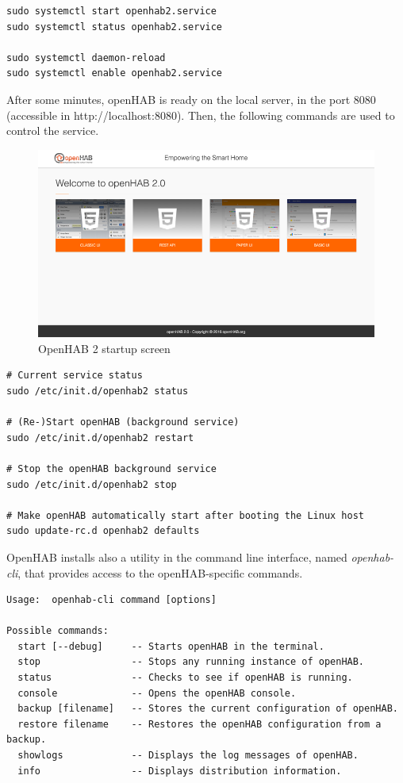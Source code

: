 \begin{lstlisting}[style=Consola]
sudo systemctl start openhab2.service
sudo systemctl status openhab2.service

sudo systemctl daemon-reload
sudo systemctl enable openhab2.service
\end{lstlisting}

After some minutes, openHAB is ready on the local server, in the port 8080 (accessible in http://localhost:8080). Then, the following
commands are used to control the service.

\begin{figure}
    \centering
    \includegraphics[width=1\textwidth]{images/Chapter_06/openhab-startup.png}
    \caption{OpenHAB 2 startup screen}
    \label{fig:openhab-startup}
\end{figure}

\begin{lstlisting}[style=Consola]
# Current service status
sudo /etc/init.d/openhab2 status

# (Re-)Start openHAB (background service)
sudo /etc/init.d/openhab2 restart

# Stop the openHAB background service
sudo /etc/init.d/openhab2 stop

# Make openHAB automatically start after booting the Linux host
sudo update-rc.d openhab2 defaults
\end{lstlisting}

OpenHAB installs also a utility in the command line interface, named \textit{openhab-cli}, that provides access to the openHAB-specific 
commands.

\begin{lstlisting}[style=Consola]
Usage:  openhab-cli command [options]

Possible commands:
  start [--debug]     -- Starts openHAB in the terminal.
  stop                -- Stops any running instance of openHAB.
  status              -- Checks to see if openHAB is running.
  console             -- Opens the openHAB console.
  backup [filename]   -- Stores the current configuration of openHAB.
  restore filename    -- Restores the openHAB configuration from a backup.
  showlogs            -- Displays the log messages of openHAB.
  info                -- Displays distribution information.
\end{lstlisting}

